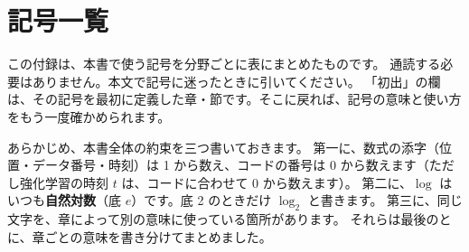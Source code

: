 \chapter{記号一覧}\label{app:notation}

この付録は、本書で使う記号を分野ごとに表にまとめたものです。
通読する必要はありません。本文で記号に迷ったときに引いてください。
「初出」の欄は、その記号を最初に定義した章・節です。そこに戻れば、記号の意味と使い方をもう一度確かめられます。

あらかじめ、本書全体の約束を三つ書いておきます。
第一に、数式の添字（位置・データ番号・時刻）は 1 から数え、コードの番号は 0 から数えます（ただし強化学習の時刻 $t$ は、コードに合わせて 0 から数えます）。
第二に、$\log$ はいつも\textbf{自然対数}（底 $e$）です。底 2 のときだけ $\log_2$ と書きます。
第三に、同じ文字を、章によって別の意味に使っている箇所があります。
それらは最後のとに、章ごとの意味を書き分けてまとめました。


